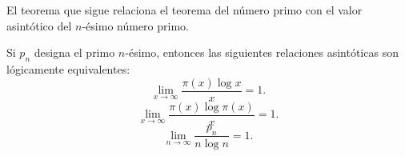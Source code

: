 \documentclass[12pt,a4paper]{book}
\begin{document}
    El teorema que sigue relaciona el teorema del número primo con el valor
    asintótico del $n$-ésimo número primo.

    \begin{teorema}
        Si $p_{n}$ designa el primo $n$-ésimo, entonces las siguientes relaciones
        asintóticas son lógicamente equivalentes:
        \begin{equation}
            \lim_{x\to\infty}\frac{\pi(x)\log x}{x}=1.
        \end{equation}
        \begin{equation}
            \lim_{x\to\infty}\frac{\pi(x)\log\pi(x)}{x}=1.
        \end{equation}
        \begin{equation}
            \lim_{n\to\infty}\frac{p_{n}}{n\log n}=1.
        \end{equation}
    \end{teorema}
\end{document}
